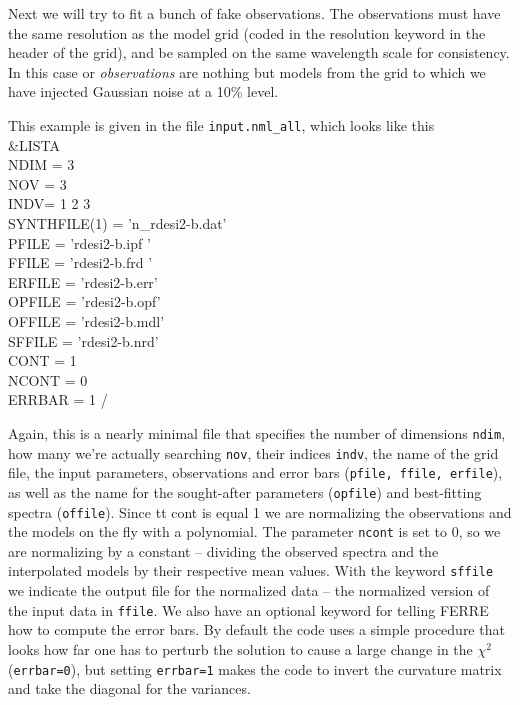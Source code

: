\documentclass[12pt]{article}
\begin{document}
Next we will try to fit a bunch of fake observations. The observations
must have the same resolution as the model grid (coded in the {\sc resolution}
keyword in the header of the grid), and be sampled on the same wavelength scale
for consistency. In this case or {\it observations} are nothing but models from 
the grid to which we have injected Gaussian noise at a 10\% level. 

This example is given in the file {\tt input.nml\_all}, which looks like this \\
 \&LISTA \\ 
 NDIM = 3 \\
 NOV = 3 \\
 INDV= 1 2 3 \\
 SYNTHFILE(1) = 'n\_rdesi2-b.dat' \\
 PFILE = 'rdesi2-b.ipf ' \\
 FFILE = 'rdesi2-b.frd ' \\
 ERFILE = 'rdesi2-b.err' \\
 OPFILE = 'rdesi2-b.opf' \\
 OFFILE = 'rdesi2-b.mdl' \\
 SFFILE = 'rdesi2-b.nrd' \\
 CONT = 1 \\
 NCONT = 0 \\
 ERRBAR = 1 
 \// 

Again, this is a nearly minimal file that specifies the number of dimensions {\tt ndim}, 
how many we're actually searching {\tt nov}, their indices {\tt indv}, the name of 
the grid file, the input parameters, observations and error bars ({\tt pfile, ffile, erfile}), 
as well as the name for the sought-after parameters ({\tt opfile})
and best-fitting spectra ({\tt offile}). Since {
tt cont} is equal 1 we are normalizing the observations and the models on the fly with a polynomial. The parameter {\tt ncont} is set to 0, so we are normalizing by a constant -- dividing the observed spectra and the interpolated models by their respective mean values. With the keyword {\tt sffile} we indicate the output file for the normalized data -- the normalized version of the input data in {\tt ffile}. We also have an optional keyword for telling 
FERRE how to compute the error bars. By default the code uses a simple procedure that 
looks how far one has to perturb the solution to cause a large change in 
the $\chi^2$ ({\tt errbar=0}), but setting {\tt errbar=1} makes the code to 
invert the curvature matrix and take the diagonal for the variances. 
\end{document}
